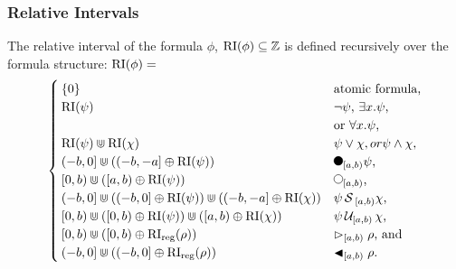 \documentclass{beamer}
\begin{document}
\begin{frame}
    \frametitle{Relative Intervals}
    \begin{definition} 
        \label{def:rel-int}
        The relative interval of the formula $\phi$, $\operatorname{RI}(\phi) \subseteq \mathbb{Z}$ is defined recursively over the formula structure: 
        $\operatorname{RI}(\phi) =$
        \begin{equation*}
            \begin{cases}
                \{0\}     & \text{atomic formula,} \\ 
                \RI(\psi) & \text{$\neg \psi$, 
                                    $\exists x.\psi$,} \\ &\text{or $\forall x.\psi$,} \\
                \RI(\psi) \Cup \RI(\chi) & \text{$\psi \lor \chi, or
                                                \psi \land \chi$,} \\
                (-b,0] \Cup ((-b,-a] \oplus \RI(\psi)) & \text{$\Previous{[a,b)}\psi$,} \\
                [0,b) \Cup ([a,b) \oplus \RI(\psi)) & \text{$\Next{[a,b)}$,}\\
                (-b,0] \Cup ((-b,0] \oplus \RI(\psi)) \Cup ((-b,-a] \oplus \RI(\chi)) & \text{$\psi \Since{}_{[a,b)} \chi$,} \\
                [0,b) \Cup ([0,b) \oplus \RI(\psi)) \Cup ([a,b) \oplus \RI(\chi)) & \text{$\psi \Until{[a,b)} \chi$,} \\
                [0,b) \Cup ([0,b) \oplus \RIr(\rho)) & \text{$\Fregex{[a,b)} \rho$, and}\\
                (-b,0] \Cup ((-b,0] \oplus \RIr(\rho)) & \text{$\Pregex{[a,b)} \rho$.}\\
            \end{cases}
        \end{equation*}
    \end{definition}
\end{frame}
\end{document}
